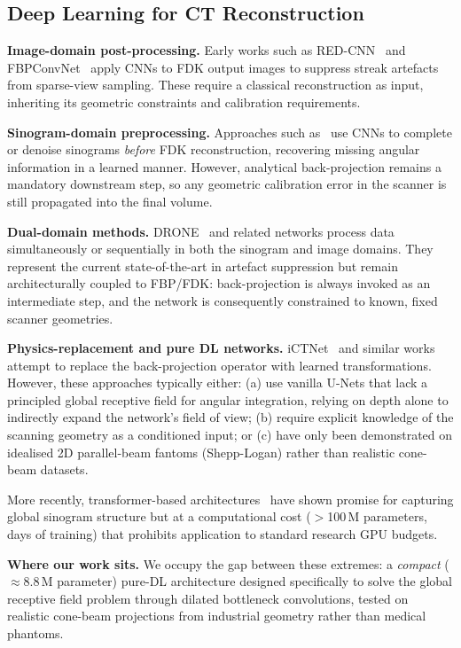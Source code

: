 \documentclass[10pt,twocolumn]{article}
\begin{document}
\subsection{Deep Learning for CT Reconstruction}

\textbf{Image-domain post-processing.}
Early works such as RED-CNN~\cite{chen2017} and FBPConvNet~\cite{jin2017}
apply CNNs to FDK output images to suppress streak artefacts from
sparse-view sampling.
These require a classical reconstruction as input, inheriting its
geometric constraints and calibration requirements.

\textbf{Sinogram-domain preprocessing.}
Approaches such as~\cite{lee2018} use CNNs to complete or denoise
sinograms \textit{before} FDK reconstruction, recovering missing
angular information in a learned manner.
However, analytical back-projection remains a mandatory downstream step,
so any geometric calibration error in the scanner is still
propagated into the final volume.

\textbf{Dual-domain methods.}
DRONE~\cite{wu2021drone} and related networks process data
simultaneously or sequentially in both the sinogram and image
domains.
They represent the current state-of-the-art in artefact suppression
but remain architecturally coupled to FBP/FDK: back-projection is
always invoked as an intermediate step, and the network is
consequently constrained to known, fixed scanner geometries.

\textbf{Physics-replacement and pure DL networks.}
iCTNet~\cite{liu2020} and similar works attempt to replace the
back-projection operator with learned transformations.
However, these approaches typically either:
(a) use vanilla U-Nets that lack a principled global receptive field
for angular integration, relying on depth alone to indirectly
expand the network's field of view;
(b) require explicit knowledge of the scanning geometry as a
conditioned input; or
(c) have only been demonstrated on idealised 2D parallel-beam
fantoms (Shepp-Logan) rather than realistic cone-beam datasets.

More recently, transformer-based architectures~\cite{han2016}
have shown promise for capturing global sinogram structure
but at a computational cost ($>$100\,M parameters, days of
training) that prohibits application to standard research
GPU budgets.

\textbf{Where our work sits.}
We occupy the gap between these extremes:
a \emph{compact} ($\approx$8.8\,M parameter) pure-DL architecture
designed specifically to solve the global receptive field problem
through dilated bottleneck convolutions, tested on realistic
cone-beam projections from industrial geometry rather than
medical phantoms.
\end{document}
